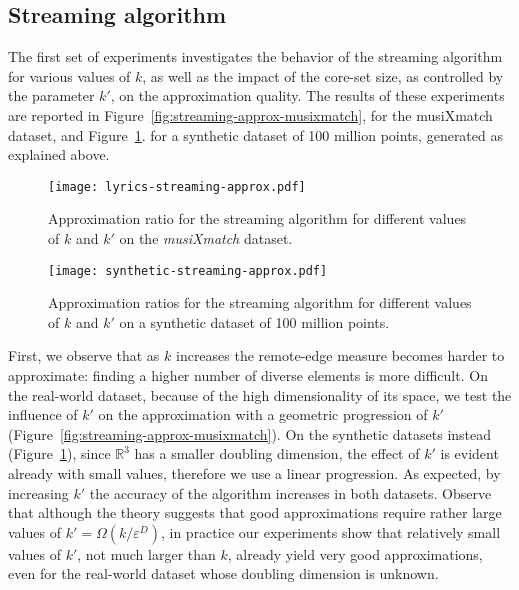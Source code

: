 \documentclass{article}
\renewcommand{\epsilon}{\varepsilon}
\begin{document}
\subsection{Streaming algorithm}\label{sec:streaming-experiments}

The first set of experiments investigates the behavior of the
streaming algorithm for various values of $k$, as well as the impact
of the core-set size, as controlled by the parameter $k'$, on the
approximation quality. The results of these experiments are reported
in Figure~\ref{fig:streaming-approx-musixmatch},
for the musiXmatch dataset, and Figure~\ref{fig:streaming-approx-synthetic}.
for a synthetic dataset of 100 million points, generated as explained above.

\begin{figure}[t]
  \begin{minipage}{.49\linewidth}
    \centering
    \texttt{[image: lyrics-streaming-approx.pdf]}
    \caption{Approximation ratio for the streaming algorithm for different values of $k$ and $k'$ on the \emph{musiXmatch} dataset.}\label{fig:streaming-approx-musixmatch}
  \end{minipage}
  \hfill
  \begin{minipage}{.49\linewidth}
    \centering
    \texttt{[image: synthetic-streaming-approx.pdf]}
    \caption{Approximation ratios for the streaming algorithm for different values of $k$ and $k'$ on a synthetic dataset of 100 million points.}\label{fig:streaming-approx-synthetic}
  \end{minipage}
\end{figure}

First, we observe that as $k$ increases the remote-edge measure becomes harder to approximate: finding a higher number of diverse elements is more difficult.
On the real-world dataset, because of the high dimensionality of its
space, we test the influence of $k'$ on the approximation with a
geometric progression of $k'$
(Figure~\ref{fig:streaming-approx-musixmatch}).  On the synthetic
datasets instead (Figure~\ref{fig:streaming-approx-synthetic}), since
$\mathbb{R}^3$ has a smaller doubling dimension, the effect of $k'$ is
evident already with small values, therefore we use a linear
progression.
As expected, by increasing $k'$ the accuracy of the algorithm increases in both
datasets. Observe that although the theory suggests that good
approximations require rather large values of $k' =
\Omega(k/\epsilon^D)$, in practice our experiments show that
relatively small values of $k'$, not much larger than $k$, already
yield very good approximations, even for the real-world dataset
whose doubling dimension is unknown.
\end{document}
